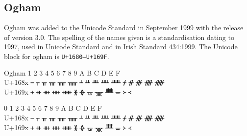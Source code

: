 \subsection{Ogham}

\newfontfamily{}

Ogham was added to the Unicode Standard in September 1999 with the release of version 3.0.
The spelling of the names given is a standardisation dating to 1997, used in Unicode Standard and in Irish Standard 434:1999.
The Unicode block for ogham is \texttt{U+1680–U+169F}.

\begin{scriptexample}[]{Ogham}
\bgroup
{}	1	2	3	4	5	6	7	8	9	A	B	C	D	E	F\\
U+168x	   	ᚁ	ᚂ	ᚃ	ᚄ	ᚅ	ᚆ	ᚇ	ᚈ	ᚉ	ᚊ	ᚋ	ᚌ	ᚍ	ᚎ	ᚏ\\
U+169x	ᚐ	ᚑ	ᚒ	ᚓ	ᚔ	ᚕ	ᚖ	ᚗ	ᚘ	ᚙ	ᚚ	᚛	᚜	\\

\titus

0	1	2	3	4	5	6	7	8	9	A	B	C	D	E	F\\
U+168x	   	ᚁ	ᚂ	ᚃ	ᚄ	ᚅ	ᚆ	ᚇ	ᚈ	ᚉ	ᚊ	ᚋ	ᚌ	ᚍ	ᚎ	ᚏ\\
U+169x	ᚐ	ᚑ	ᚒ	ᚓ	ᚔ	ᚕ	ᚖ	ᚗ	ᚘ	ᚙ	ᚚ	᚛	᚜
\egroup		
\end{scriptexample}